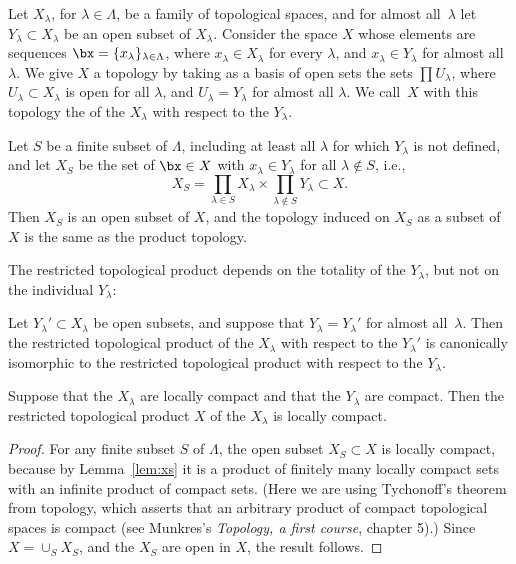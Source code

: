 \documentclass[11pt]{book}
\begin{document}
\begin{ch}
\begin{definition}
  Let $X_\lambda$, for $\lambda\in\Lambda$, be a family of topological
  spaces, and for almost all~$\lambda$ let $Y_{\lambda}\subset
  X_{\lambda}$ be an open subset of $X_{\lambda}$.  Consider the space
  $X$ whose elements are sequences $\bx = \{x_\lambda\}_{\lambda\in
    \Lambda}$, where $x_\lambda\in X_\lambda$ for every $\lambda$, and
  $x_\lambda\in Y_{\lambda}$ for almost all~$\lambda$.  We give $X$ a
  topology by taking as a basis of open sets the sets $\prod
  U_{\lambda}$, where $U_{\lambda}\subset X_{\lambda}$ is open for all
  $\lambda$, and $U_{\lambda} = Y_{\lambda}$ for almost all $\lambda$.
  We call~$X$ with this topology the  of the $X_{\lambda}$ with respect to the $Y_{\lambda}$.
\end{definition}


\begin{corollary}\label{lem:xs}
  Let $S$ be a finite subset of $\Lambda$, including at least all $\lambda$ for which $Y_\lambda$ is not defined, and let $X_S$ be the set of
  $\bx\in X$ with $x_\lambda\in Y_\lambda$ for all $\lambda\not\in S$,
  i.e.,
  $$
  X_S = \prod_{\lambda \in S} X_{\lambda} \times
  \prod_{\lambda\not\in S} Y_{\lambda} \subset X.
  $$
  Then $X_S$ is an open subset of $X$, and the topology induced on
  $X_S$ as a subset of $X$ is the same as the product topology.
\end{corollary}

The restricted topological product depends on the totality of the
$Y_{\lambda}$, but not on the individual $Y_{\lambda}$:
\begin{lemma}
  Let $Y_{\lambda}'\subset X_{\lambda}$ be open subsets, and suppose
  that $Y_{\lambda} = Y_{\lambda}'$ for almost all~$\lambda$.  Then
  the restricted topological product of the $X_\lambda$ with respect
  to the $Y_{\lambda}'$ is canonically isomorphic to the restricted
  topological product with respect to the $Y_{\lambda}$.
\end{lemma}

\begin{lemma}\label{lem:res_compact}
  Suppose that the $X_\lambda$ are locally compact and that the
  $Y_\lambda$ are compact.  Then the restricted topological
product $X$ of the $X_\lambda$ is locally compact.
\end{lemma}
\begin{proof}
  For any finite subset $S$ of $\Lambda$, the open subset $X_S\subset
  X$ is locally compact, because by Lemma~\ref{lem:xs} it is a product
  of finitely many locally compact sets with an infinite product of
  compact sets.  (Here we are using Tychonoff's theorem from topology,
  which asserts that an arbitrary product of compact topological
  spaces is compact (see Munkres's {\em Topology, a first course},
  chapter 5).) Since $X=\cup_{S} X_S$, and the $X_S$ are open in $X$,
  the result follows.
\end{proof}


\end{ch}
\end{document}

